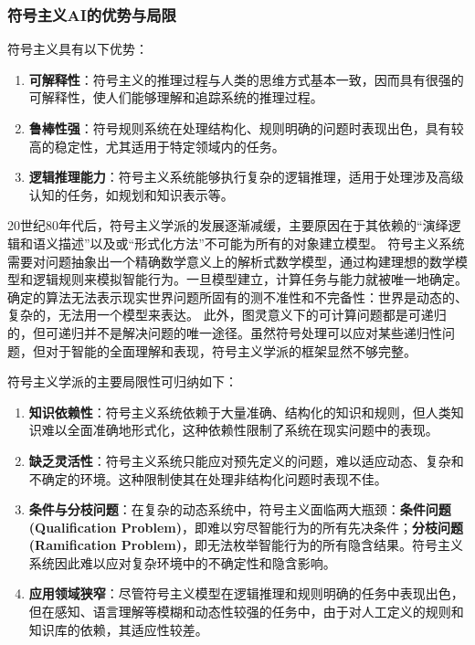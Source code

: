 \subsubsection*{符号主义AI的优势与局限}

符号主义具有以下优势：

\begin{enumerate}
\item   {\bf 可解释性}：符号主义的推理过程与人类的思维方式基本一致，因而具有很强的可解释性，使人们能够理解和追踪系统的推理过程。
\item   {\bf 鲁棒性强}：符号规则系统在处理结构化、规则明确的问题时表现出色，具有较高的稳定性，尤其适用于特定领域内的任务。
\item {\bf 逻辑推理能力}：符号主义系统能够执行复杂的逻辑推理，适用于处理涉及高级认知的任务，如规划和知识表示等。
\end{enumerate}

 20世纪80年代后，符号主义学派的发展逐渐减缓，主要原因在于其依赖的“演绎逻辑和语义描述”以及或“形式化方法”不可能为所有的对象建立模型。
 符号主义系统需要对问题抽象出一个精确数学意义上的解析式数学模型，通过构建理想的数学模型和逻辑规则来模拟智能行为。一旦模型建立，计算任务与能力就被唯一地确定。
 确定的算法无法表示现实世界问题所固有的测不准性和不完备性：世界是动态的、复杂的，无法用一个模型来表达。
此外，图灵意义下的可计算问题都是可递归的，但可递归并不是解决问题的唯一途径。虽然符号处理可以应对某些递归性问题，但对于智能的全面理解和表现，符号主义学派的框架显然不够完整。

符号主义学派的主要局限性可归纳如下：
\begin{enumerate}
\item    {\bf 知识依赖性}：符号主义系统依赖于大量准确、结构化的知识和规则，但人类知识难以全面准确地形式化，这种依赖性限制了系统在现实问题中的表现。
\item   {\bf 缺乏灵活性}：符号主义系统只能应对预先定义的问题，难以适应动态、复杂和不确定的环境。这种限制使其在处理非结构化问题时表现不佳。
\item   {\bf 条件与分枝问题}：在复杂的动态系统中，符号主义面临两大瓶颈：{\bf 条件问题(Qualification Problem)}，即难以穷尽智能行为的所有先决条件；{\bf 分枝问题(Ramification Problem)}，即无法枚举智能行为的所有隐含结果。符号主义系统因此难以应对复杂环境中的不确定性和隐含影响。
\item   {\bf 应用领域狭窄}：尽管符号主义模型在逻辑推理和规则明确的任务中表现出色，但在感知、语言理解等模糊和动态性较强的任务中，由于对人工定义的规则和知识库的依赖，其适应性较差。
  \end{enumerate}
 
